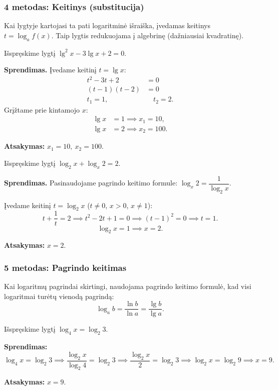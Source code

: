 \subsubsection*{4 metodas: Keitinys (substitucija)}

Kai lygtyje kartojasi ta pati logaritminė išraiška, įvedamas keitinys $t = \log_a f(x)$. Taip lygtis redukuojama į algebrinę (dažniausiai kvadratinę).

\begin{example}
Išspręskime lygtį $\lg^2 x - 3\lg x + 2 = 0$.

\textbf{Sprendimas.} Įvedame keitinį $t = \lg x$:
\begin{align*}
t^2 - 3t + 2 &= 0 \\
(t - 1)(t - 2) &= 0 \\
t_1 = 1, &\quad t_2 = 2.
\end{align*}
Grįžtame prie kintamojo $x$:
\begin{align*}
\lg x &= 1 \implies x_1 = 10, \\
\lg x &= 2 \implies x_2 = 100.
\end{align*}

\textbf{Atsakymas:} $x_1 = 10,\ x_2 = 100$.
\end{example}

\begin{example}
Išspręskime lygtį $\log_2 x + \log_x 2 = 2$.

\textbf{Sprendimas.} Pasinaudojame pagrindo keitimo formule: $\log_x 2 = \dfrac{1}{\log_2 x}$.

Įvedame keitinį $t = \log_2 x$ ($t \neq 0$, $x > 0$, $x \neq 1$):
\[
t + \frac{1}{t} = 2 \implies t^2 - 2t + 1 = 0 \implies (t-1)^2 = 0 \implies t = 1.
\]
\[
\log_2 x = 1 \implies x = 2.
\]

\textbf{Atsakymas:} $x = 2$.
\end{example}

\subsubsection*{5 metodas: Pagrindo keitimas}

Kai logaritmų pagrindai skirtingi, naudojama pagrindo keitimo formulė, kad visi logaritmai turėtų vienodą pagrindą:
\[
\log_a b = \frac{\ln b}{\ln a} = \frac{\lg b}{\lg a}.
\]

\begin{example}
Išspręskime lygtį $\log_4 x = \log_2 3$.

\textbf{Sprendimas:}
\[
\log_4 x = \log_2 3 \implies \frac{\log_2 x}{\log_2 4} = \log_2 3 \implies \frac{\log_2 x}{2} = \log_2 3 \implies \log_2 x = \log_2 9 \implies x = 9.
\]

\textbf{Atsakymas:} $x = 9$.
\end{example}

